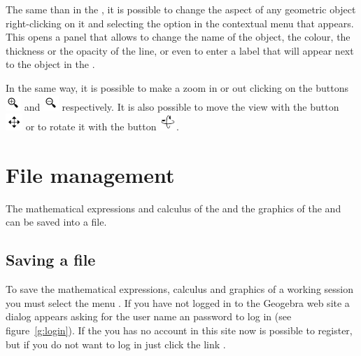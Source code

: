 The same than in the , it is possible to change the aspect of any geometric object right-clicking on it and selecting the option  in the contextual menu that appears.
This opens a panel that allows to change the name of the object, the colour, the thickness or the opacity of the line, or even to enter a label that will appear next to the object in the .

In the same way, it is possible to make a zoom in or out clicking on the buttons \includegraphics[scale=0.03]{img/introduction/zoom-in-button} and \includegraphics[scale=0.03]{img/introduction/zoom-out-button} respectively.
It is also possible to move the view with the button \includegraphics[scale=0.03]{img/introduction/move-button} or to rotate it with the button \includegraphics[scale=0.03]{img/introduction/rotate-button}.


\section{File management}
The mathematical expressions and calculus of the  and the graphics of the  and  can be saved into a file.

\subsection*{Saving a file}
To save the mathematical expressions, calculus and graphics of a working session you must select the menu .
If you have not logged in to the Geogebra web site a dialog appears asking for the user name an password to log in (see figure~\ref{g:login}).
If the you has no account in this site now is possible to register, but if you do not want to log in just click the link .

